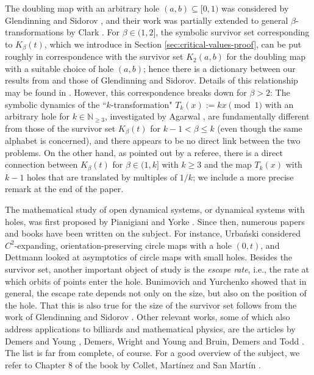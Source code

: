 \documentclass[12pt]{amsart}
\theoremstyle{definition}
\theoremstyle{remark}
\numberwithin{equation}{section}
\newcommand{\N}{\ensuremath{\mathbb{N}}}
\begin{document}
The doubling map with an arbitrary hole $(a,b)\subseteq [0,1)$ was considered by Glendinning and Sidorov \cite{Glendinning-Sidorov-2015}, and their work was partially extended to general $\beta$-transformations by Clark \cite{Clark-2016}. For $\beta\in(1,2]$, the symbolic survivor set corresponding to $K_\beta(t)$, which we introduce in Section \ref{sec:critical-values-proof}, can be put roughly in correspondence with the survivor set $K_2(a,b)$ for the doubling map with a suitable choice of hole $(a,b)$; hence there is a dictionary between our results from \cite{Allaart-Kong-2021} and those of Glendinning and Sidorov. Details of this relationship may be found in \cite{Allaart-Kong-2023}. However, this correspondence breaks down for $\beta>2$: The symbolic dynamics of the ``$k$-transformation" $T_k(x):=kx\pmod 1$ with an arbitrary hole for $k\in\N_{\geq 3}$, investigated by Agarwal \cite{Agarwal-2020}, are fundamentally different from those of the survivor set $K_\beta(t)$ for $k-1<\beta\leq k$ (even though the same alphabet is concerned), and there appears to be no direct link between the two problems. On the other hand, as pointed out by a referee, there is a direct connection between $K_\beta(t)$ for $\beta\in (1,k]$ with $k\geq 3$ and the map $T_k(x)$ with $k-1$ holes that are translated by multiples of $1/k$; we include a more precise remark at the end of the paper.

\bigskip

The mathematical study of open dynamical systems, or dynamical systems with holes, was first proposed by Pianigiani and Yorke \cite{Pianigiani-Yorke-1979}. Since then, numerous papers and books have been written on the subject. For instance, Urba\'nski \cite{Urbanski_1986} considered $C^2$-expanding, orientation-preserving circle maps with a hole $(0,t)$, and Dettmann \cite{Dettmann-2013} looked at asymptotics of circle maps with small holes. Besides the survivor set, another important object of study is the {\em escape rate}, i.e., the rate at which orbits of points enter the hole. Bunimovich and Yurchenko \cite{Bunimovich-Yurchenko-2011} showed that in general, the escape rate depends not only on the size, but also on the position of the hole. That this is also true for the size of the survivor set follows from the work of Glendinning and Sidorov \cite{Glendinning-Sidorov-2015}. Other relevant works, some of which also address applications to billiards and mathematical physics, are the articles by Demers and Young \cite{Demers-Young-2006}, Demers, Wright and Young \cite{Demers-Wright-Young-2010} and Bruin, Demers and Todd \cite{Bruin-Demers-Todd-2018}. The list is far from complete, of course. For a good overview of the subject, we refer to Chapter 8 of the book by Collet, Mart\'inez and San Mart\'in \cite{Collet-Martinez-SanMartin-2013}.   
\end{document}
